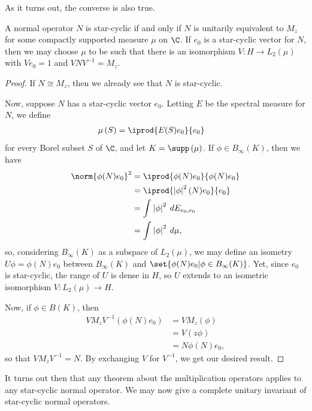 \documentclass[10pt]{mypackage}
\begin{document}
As it turns out, the converse is also true.
\begin{theorem}
  A normal operator $N$ is star-cyclic if and only if $N$ is unitarily equivalent to $M_z$ for some compactly supported measure $\mu$ on $\C$. If $e_0$ is a star-cyclic vector for $N$, then we may choose $\mu$ to be such that there is an isomorphism $V\colon H\rightarrow L_2\left( \mu \right)$ with $Ve_0 = 1$ and $VNV^{-1} = M_z$.
\end{theorem}
\begin{proof}
  If $N\cong M_z$, then we already see that $N$ is star-cyclic.

  Now, suppose $N$ has a star-cyclic vector $e_0$. Letting $E$ be the spectral measure for $N$, we define
  \begin{align*}
    \mu\left( S \right) &= \iprod{E(S)e_0}{e_0}
  \end{align*}
  for every Borel subset $S$ of $\C$, and let $K = \supp\left( \mu \right)$. If $\phi\in B_{\infty}(K)$, then we have
  \begin{align*}
    \norm{\phi(N)e_0}^2 &= \iprod{\phi(N)e_0}{\phi(N)e_0}\\
                        &= \iprod{\left\vert \phi \right\vert^2(N)e_0}{e_0}\\
                        &= \int_{}^{} \left\vert \phi \right\vert^2\:dE_{e_0,e_0}\\
                        &= \int_{}^{} \left\vert \phi \right\vert^2\:d\mu,
  \end{align*}
  so, considering $B_{\infty}(K)$ as a subspace of $L_2\left( \mu \right)$, we may define an isometry $U\phi = \phi(N)e_0$ between $B_{\infty}(K)$ and $\set{\phi(N)e_0 | \phi\in B_{\infty}(K)}$. Yet, since $e_0$ is star-cyclic, the range of $U$ is dense in $H$, so $U$ extends to an isometric isomorphism $V\colon L_2\left( \mu \right)\rightarrow H$.

  Now, if $\phi\in B(K)$, then
  \begin{align*}
    VM_zV^{-1}\left( \phi(N)e_0 \right) &= VM_z(\phi)\\
                                            &= V\left( z\phi \right)\\
                                            &= N\phi(N)e_0,
  \end{align*}
  so that $VM_zV^{-1} = N$. By exchanging $V$ for $V^{-1}$, we get our desired result.
\end{proof}
It turns out then that any theorem about the multiplication operators applies to any star-cyclic normal operator. We may now give a complete unitary invariant of star-cyclic normal operators.
\end{document}
